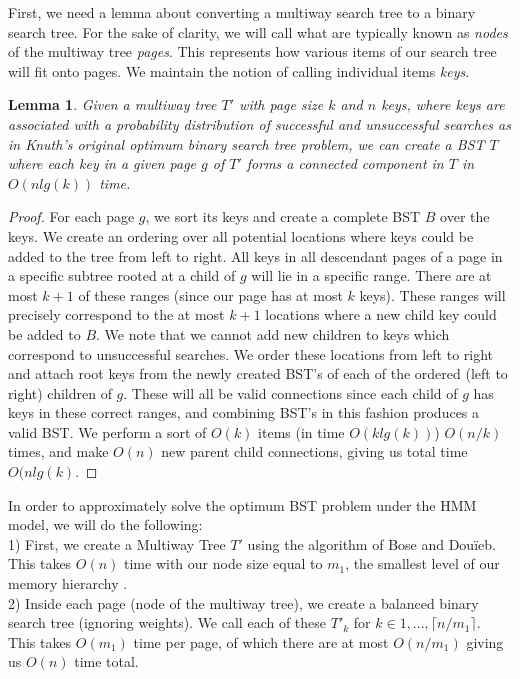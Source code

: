 \documentclass[letterpaper,12pt,titlepage,oneside,final]{book}
\theoremstyle{plain}
\newtheorem{lem}[thm]{Lemma}
\begin{document}
First, we need a lemma about converting a multiway search tree to a binary search tree. For the sake of clarity, we will call what are typically known as \textit{nodes} of the multiway tree \textit{pages}. This represents how various items of our search tree will fit onto pages. We maintain the notion of calling individual items \textit{keys}.

\begin{lem}
Given a multiway tree $T'$ with page size $k$ and $n$ keys, where keys are associated with a probability distribution of successful and unsuccessful searches as in Knuth's original optimum binary search tree problem, we can create a BST $T$ where each key in a given page $g$ of $T'$ forms a connected component in $T$ in $O(nlg(k))$ time.
\end{lem}

\begin{proof}
For each page $g$, we sort its keys and create a complete BST $B$ over the keys. We create an ordering over all potential locations where keys could be added to the tree from left to right. All keys in all descendant pages of a page in a specific subtree rooted at a child of $g$ will lie in a specific range. There are at most $k+1$ of these ranges (since our page has at most $k$ keys). These ranges will precisely correspond to the at most $k+1$ locations where a new child key could be added to $B$. We note that we cannot add new children to keys which correspond to unsuccessful searches. We order these locations from left to right and attach root keys from the newly created BST's of each of the ordered (left to right) children of $g$. These will all be valid connections since each child of $g$ has keys in these correct ranges, and combining BST's in this fashion produces a valid BST. We perform a sort of $O(k)$ items (in time $O(klg(k))$) $O(n/k)$ times, and make $O(n)$ new parent child connections, giving us total time $O(n lg(k)$.
\end{proof}

In order to approximately solve the optimum BST problem under the HMM model, we will do the following: \\

1) First, we create a Multiway Tree $T'$ using the algorithm of Bose and Dou\"{i}eb. This takes $O(n)$ time with our node size equal to $m_1$, the smallest level of our memory hierarchy \cite{bose2009efficient}. \\

2) Inside each page (node of the multiway tree), we create a balanced binary search tree (ignoring weights). We call each of these $T'_k$ for $k \in {1,...,\lceil n/m_1 \rceil}$.   This takes $O(m_1)$ time per page, of which there are at most $O(n/m_1)$ giving us $O(n)$ time total. \\
\end{document}
